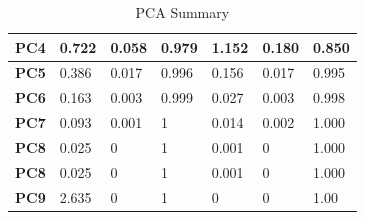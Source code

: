 \documentclass[12pt,a4paper]{article}
\begin{document}
\begin{enumerate}[label=\roman*)]
\begin{table}[h]
\begin{tabular}{|l|l|l|l|l|l|l|}
	\textbf{PC4}       & 0.722            & 0.058                                                                      & 0.979                                                                     & 1.152            & {\color[HTML]{FE0000} 0.180}                                               & {\color[HTML]{FE0000} 0.850}                                              \\ \hline
	\textbf{PC5}       & 0.386            & 0.017                                                                      & 0.996                                                                     & 0.156            & 0.017                                                                      & 0.995                                                                     \\ \hline
	\textbf{PC6}       & 0.163            & 0.003                                                                      & 0.999                                                                     & 0.027            & 0.003                                                                      & 0.998                                                                     \\ \hline
	\textbf{PC7}       & 0.093            & 0.001                                                                      & 1                                                                         & 0.014            & 0.002                                                                      & 1.000                                                                     \\ \hline
	\textbf{PC8}       & 0.025            & 0                                                                          & 1                                                                         & 0.001            & 0                                                                          & 1.000                                                                     \\ \hline
	\textbf{PC8}       & 0.025            & 0                                                                          & 1                                                                         & 0.001            & 0                                                                          & 1.000                                                                     \\ \hline
	\textbf{PC9}       & 2.635            & 0                                                                          & 1                                                                         & 0                & 0                                                                          & 1.00                                                                      \\ \hline
	\end{tabular}
\caption{PCA Summary}
\label{ps1}
\end{table}


\end{enumerate}
\end{document}

